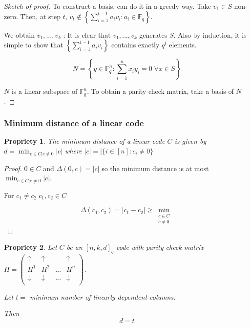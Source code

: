 \documentclass{article}
\newtheorem{prop}{Propriety}
\begin{document}
\begin{proof}[Sketch of proof]
To construct a basis, can do it in a greedy way. Take $v_1 \in S$ non-zero. Then, at step $t$, $v_t \notin \left\{ \sum_{i=1}^{t-1} a_i v_i : a_i 
\in \mathbb{F}_q \right\}$.

We obtain $v_1,...,v_k$ : It is clear that $v_1,...,v_k$ generates $S$. Also by induction, it is simple to show that $\left\{ \sum_{i=1}^{t-1} a_i v_i \right\}$ contains exactly $q^t$ elements.

\[N= \left\{ y \in \mathbb{F}_q^n : \sum_{i=1}^n x_iy_i=0 \; \forall x \in S \right\}\]

$N$ is a linear subspace of $\mathbb{F}_q^n$. To obtain a parity check matrix, take a basis of $N$.
\end{proof}

\subsubsection*{Minimum distance of a linear code}

\begin{prop}
The minimum distance of a linear code $C$ is given by $d= \min_{c\in C|c\neq 0} |c|$ where $|c|=|\{ i \in [n] : c_i\neq 0 \}$
\end{prop}

\begin{proof}
$0\in C$ and $\Delta(0,c)=|c|$ so the minimum distance is at most $\min_{c\in C|c\neq 0} |c|$.

For $c_1\neq c_2 \; c_1,c_2 \in C$

\[\Delta(c_1,c_2)=|c_1-c_2|\geq \min_{\substack{c\in C\\c\neq 0}}\]
\end{proof}

\begin{prop}
Let $C$ be an $[n,k,d]_q$ code with parity check matrix $H=\begin{pmatrix}
\uparrow & \uparrow & & \uparrow\\
H^1 & H^2 & \hdots & H^n\\
\downarrow & \downarrow & ... & \downarrow\\
\end{pmatrix}$.

Let $t=$ minimum number of linearly dependent columns.

Then 
\[d=t\]
\end{prop}
\end{document}
